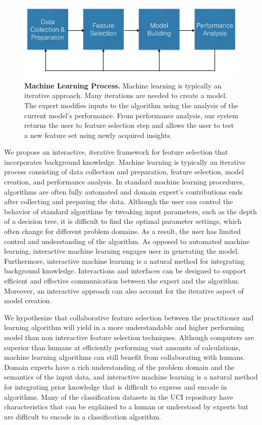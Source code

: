 \begin{figure}[h]
\centering
\includegraphics[width=1\textwidth]{MLflow}
\caption{ \textbf{Machine Learning Process.} Machine learning is typically an iterative approach. Many iterations are needed to create a model. The expert modifies inputs to the algorithm using the analysis of the current model's performance. From performance analysis, our system returns the user to feature selection step and allows the user to test a new feature set using newly acquired insights. }\label{fig:MLflow}
\end{figure}

We propose an interactive, iterative framework for feature selection that incorporates background knowledge. Machine learning is typically an iterative process consisting of data collection and preparation, feature selection, model creation, and performance analysis. In standard machine learning procedures, algorithms are often fully automated and domain expert’s contributions ends after collecting and preparing the data. Although the user can control the behavior of standard algorithms by tweaking input parameters, such as the depth of a decision tree, it is difficult to find the optimal parameter settings, which often change for different problem domains. As a result, the user has limited control and understanding of the algorithm. As opposed to automated machine learning, interactive machine learning engages user in generating the model. Furthermore, interactive machine learning is a natural method for integrating background knowledge. Interactions and interfaces can be designed to support efficient and effective communication between the expert and the algorithm. Moreover, an interactive approach can also account for the iterative aspect of model creation. 

We hypothesize that collaborative feature selection between the practitioner and learning algorithm will yield in a more understandable and higher performing model than non interactive feature selection techniques. Although computers are superior than humans at efficiently performing vast amounts of calculations, machine learning algorithms can still benefit from collaborating with humans. Domain experts have a rich understanding of the problem domain and the semantics of the input data, and interactive machine learning is a natural method for integrating prior knowledge that is difficult to express and encode in algorithms. Many of the classification datasets in the UCI repository have characteristics that can be explained to a human or understood by experts but are difficult to encode in a classification algorithm. 

